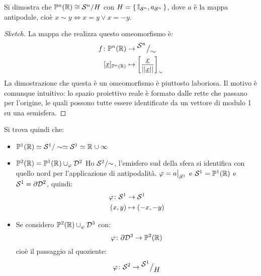 \begin{lemma}
  Si dimostra che $ \mathbb{P}^{n} (\mathbb{R}) \cong {\mathcal{S}^{n}} \slash {H} $ con $ H = \set{\mathbb{I}_{\mathcal{S}^{n}}, a_{\mathcal{S}^{n}}} $, dove
  $ a $ è la mappa antipodale, cioè $ x \sim y \iff x = y \vee x = - y $.
\end{lemma}
\begin{proof}[Sketch]
  La mappa che realizza questo omeomorfismo è:
  \begin{align*}
    f \colon \Pjr{n} & \to \quot{\Sph{n}}{\sim}\\
    [\vec{x}]_{\Pjr{n}} & \mapsto \left[\frac{\vec{x}}{||\vec{x}||}\right]_\sim
  \end{align*}
  La dimostrazione che questa è un omeomorfismo è piuttosto laboriosa. Il motivo è
  comunque intuitivo: lo spazio proiettivo reale è formato dalle rette che passano
  per l'origine, le quali possono tutte essere identificate da un vettore di modulo
  1 su una semisfera.
\end{proof}
\eproof
Si trova quindi che:
\begin{itemize}
\item $ \mathbb{P}^{1} (\mathbb{R}) \simeq \mathcal{S}^{1} \slash \sim \simeq \mathcal{S}^{1} \simeq \mathbb{R}^{} \cup {\infty} $
\item $ \mathbb{P}^{2} (\mathbb{R}) = \mathbb{P}^1(\mathbb{R}^{}) \cup_\varphi \mathcal{D}^{2} $
  Ho $ {\mathcal{S}^{2}} \slash {\sim} $, l'emisfero sud della sfera si identifica con quello
  nord per l'applicazione di antipodalità.
  $ \varphi = a \big \lvert_{\mathcal{S}^{1}} $ e $ \mathcal{S}^{1} = \mathbb{P}^{1} (\mathbb{R}) $ e $ \mathcal{S}^{1} = \partial \mathcal{D}^{2} $,
  quindi:
  \begin{align*}
    \varphi \colon \mathcal{S}^{1} & \to \mathcal{S}^{1} \\
    (x,y) & \mapsto (-x,-y)
  \end{align*}
\item Se considero $ \mathbb{P}^{2} (\mathbb{R}) \cup_\varphi \mathcal{D}^{3} $ con:
  \[
    \varphi \colon \partial \mathcal{D}^{3}  \to \mathbb{P}^{2} (\mathbb{R})
  \]
  cioè il passaggio al quoziente:
  \[
    \varphi \colon \mathcal{S}^{2}  \to {^{\textstyle \mathcal{S}^{1}}\big/_{\textstyle H}}
  \]
\end{itemize}

